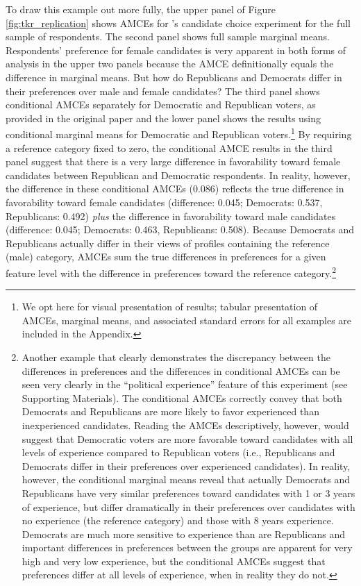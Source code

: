 \documentclass[a4paper,12pt]{article}\usepackage[]{graphicx}\usepackage[]{color}
\begin{document}
To draw this example out more fully, the upper panel of Figure \ref{fig:tkr_replication} shows AMCEs for \citeauthor{TeeleKallaRosenbluth2018}'s candidate choice experiment for the full sample of respondents. The second panel shows full sample marginal means. Respondents' preference for female candidates is very apparent in both forms of analysis in the upper two panels because the AMCE definitionally equals the difference in marginal means. But how do Republicans and Democrats differ in their preferences over male and female candidates? The third panel shows conditional AMCEs separately for Democratic and Republican voters, as provided in the original paper and the lower panel shows the results using conditional marginal means for Democratic and Republican voters.\footnote{We opt here for visual presentation of results; tabular presentation of AMCEs, marginal means, and associated standard errors for all examples are included in the Appendix.} By requiring a reference category fixed to zero, the conditional AMCE results in the third panel suggest that there is a very large difference in favorability toward female candidates between Republican and Democratic respondents. In reality, however, the difference in these conditional AMCEs (0.086) reflects the true difference in favorability toward female candidates (difference: 0.045; Democrats: 0.537, Republicans: 0.492) \textit{plus} the difference in favorability toward male candidates (difference: 0.045; Democrats: 0.463, Republicans: 0.508). Because Democrats and Republicans actually differ in their views of profiles containing the reference (male) category, AMCEs sum the true differences in preferences for a given feature level with the difference in preferences toward the reference category.\footnote{Another example that clearly demonstrates the discrepancy between the differences in preferences and the differences in conditional AMCEs can be seen very clearly in the ``political experience'' feature of this experiment (see Supporting Materials). The conditional AMCEs correctly convey that both Democrats and Republicans are more likely to favor experienced than inexperienced candidates. Reading the AMCEs descriptively, however, would suggest that Democratic voters are more favorable toward candidates with all levels of experience compared to Republican voters (i.e., Republicans and Democrats differ in their preferences over experienced candidates). In reality, however, the conditional marginal means reveal that actually Democrats and Republicans have very similar preferences toward candidates with 1 or 3 years of experience, but differ dramatically in their preferences over candidates with no experience (the reference category) and those with 8 years experience. Democrats are much more sensitive to experience than are Republicans and important differences in preferences between the groups are apparent for very high and very low experience, but the conditional AMCEs suggest that preferences differ at all levels of experience, when in reality they do not.}
\end{document}
